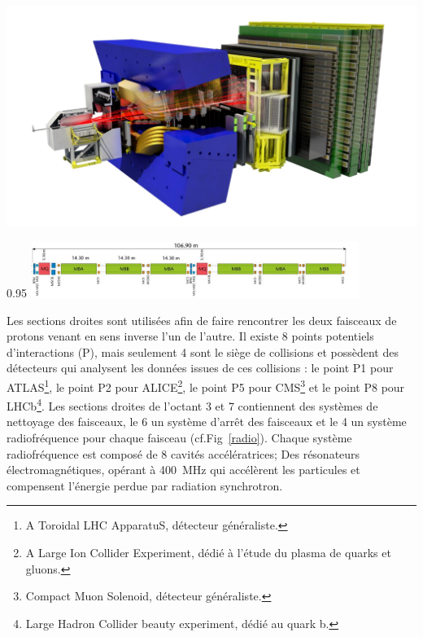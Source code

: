 \marginpar
{
	
	\includegraphics[width=\marginparwidth]{LHC/lhcb.png}
	\label{lhcb}
}
\begin{minipagewithmarginpars}[ht!]{0.95\textwidth}
	\centering
	\includegraphics[width=0.8\textwidth]{LHC/arc.jpg}
	\label{fodo}	
\end{minipagewithmarginpars}

Les sections droites sont utilisées afin de faire rencontrer les deux faisceaux de protons venant en sens inverse l'un de l'autre. Il existe \num{8} points potentiels d'interactions (P), mais seulement \num{4} sont le siège de collisions et possèdent des détecteurs qui analysent les données issues de ces collisions : le point P1 pour ATLAS\footnote{A Toroidal LHC ApparatuS, détecteur généraliste.}, le point P2 pour ALICE\footnote{A Large Ion Collider Experiment, dédié à l'étude du plasma de quarks et gluons.}, le point P5 pour CMS\footnote{Compact Muon Solenoid, détecteur généraliste.} et le point P8 pour LHCb\footnote{Large Hadron Collider beauty experiment, dédié au quark b.}. Les sections droites de l'octant \num{3} et \num{7} contiennent des systèmes de nettoyage des faisceaux, le \num{6} un système d'arrêt des faisceaux et le \num{4} un système radiofréquence pour chaque faisceau (cf.Fig~\ref{radio}). Chaque système radiofréquence est composé de \num{8} cavités accélératrices; Des résonateurs électromagnétiques, opérant à \SI{400}{\mega\hertz} qui accélèrent les particules et compensent l'énergie perdue par radiation synchrotron.


